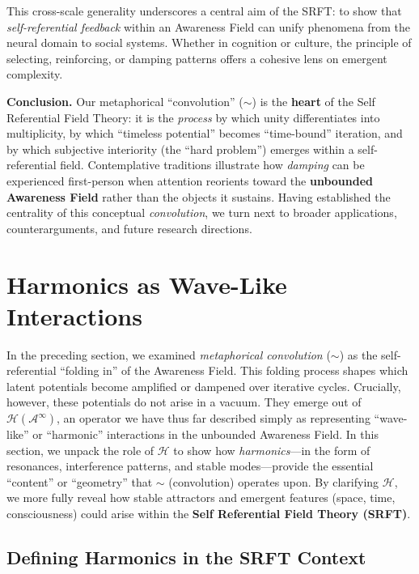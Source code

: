 \documentclass[12pt,a4paper]{article}
\begin{document}
This cross-scale generality underscores a central aim of the SRFT: to show that \emph{self-referential feedback} 
within an Awareness Field can unify phenomena from the neural domain to social systems. 
Whether in cognition or culture, the principle of selecting, reinforcing, or damping patterns 
offers a cohesive lens on emergent complexity.

\medskip
\noindent
\textbf{Conclusion.}
Our metaphorical “convolution” (\(\sim\)) is the \textbf{heart} of the Self Referential Field Theory: 
it is the \emph{process} by which unity differentiates into multiplicity, by which “timeless potential” 
becomes “time-bound” iteration, and by which subjective interiority (the “hard problem”) emerges 
within a self-referential field. Contemplative traditions illustrate how \emph{damping} can be 
experienced first-person when attention reorients toward the \textbf{unbounded Awareness Field} 
rather than the objects it sustains. Having established the centrality of this conceptual 
\emph{convolution}, we turn next to broader applications, counterarguments, and future research directions.



\section{Harmonics as Wave-Like Interactions}
\label{sec:harmonics-core}

In the preceding section, we examined \emph{metaphorical convolution} (\(\sim\)) as the
self-referential ``folding in'' of the Awareness Field. This folding process shapes which latent potentials become amplified or dampened over
iterative cycles. Crucially, however, these potentials do not arise in a vacuum. They emerge
out of \(\mathcal{H}(\mathscr{A}^\infty)\), an operator we have thus far described simply as
representing ``wave-like'' or ``harmonic'' interactions in the unbounded Awareness Field.
In this section, we unpack the role of \(\mathcal{H}\) to show how \emph{harmonics}---in
the form of resonances, interference patterns, and stable modes---provide the essential
``content'' or ``geometry'' that \(\sim\) (convolution) operates upon. By clarifying
\(\mathcal{H}\), we more fully reveal how stable attractors and emergent features (space,
time, consciousness) could arise within the \textbf{Self Referential Field Theory (SRFT)}.

\subsection{Defining Harmonics in the SRFT Context}
\label{subsec:harmonics-definition}
\end{document}
